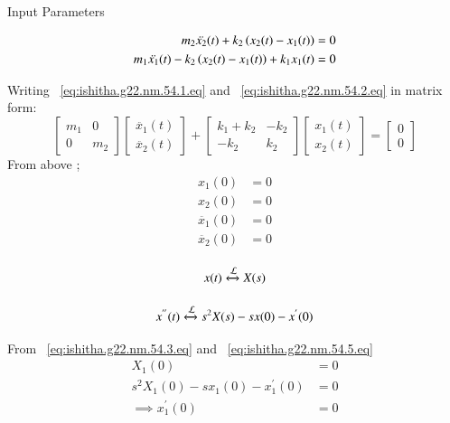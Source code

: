 \documentclass[journal,12pt,twocolumn]{IEEEtran}
\theoremstyle{remark}
\begin{document}
\begin{table}[!ht]    
    \centering
    \resizebox{9cm}{2cm}{
         
    }
    \caption{Input Parameters}
    \label{table:ishitha.g22.nm.54.t1}
\end{table}


\begin{align}
m_2\ddot{x_2}(t) + k_2\left(x_2(t)-x_1(t)\right)&=0
\label{eq:ishitha.g22.nm.54.1.eq} \\
m_1\ddot{x_1}(t) - k_2\left(x_2(t)-x_1(t)\right)+ k_1x_1(t)&=0
\label{eq:ishitha.g22.nm.54.2.eq}
\end{align}

Writing ~\eqref{eq:ishitha.g22.nm.54.1.eq} and ~\eqref{eq:ishitha.g22.nm.54.2.eq} in matrix form:
\[
\begin{bmatrix}
m_1 & 0  \\
0 & m_2
\end{bmatrix}
\begin{bmatrix}
\ddot{x_1}(t) \\
\ddot{x_2}(t)
\end{bmatrix}
+
\begin{bmatrix}
k_1+k_2 & -k_2  \\
-k_2 & k_2
\end{bmatrix}
\begin{bmatrix}
x_1(t) \\
x_2(t)
\end{bmatrix}
=
\begin{bmatrix}
0 \\
0
\end{bmatrix}
\]
From above ;
\begin{align}
x_1(0)&=0 
 \label{eq:ishitha.g22.nm.54.3.eq} \\
x_2(0)&=0 
\label{eq:ishitha.g22.nm.54.4.eq} \\
\ddot{x_1}(0)&=0 
\label{eq:ishitha.g22.nm.54.5.eq} \\
\ddot{x_2}(0)&=0
\label{eq:ishitha.g22.nm.54.6.eq} 
\end{align}

\begin{equation}
x(t)     \stackrel{}{\xleftrightarrow{\mathcal{L}}}   X(s)  
\end{equation}


\begin{equation}
x^{''}(t) \stackrel{}{\xleftrightarrow{\mathcal{L}}} s^{2}X(s)-sx(0)-x^{'}(0)
\end{equation}

From ~\eqref{eq:ishitha.g22.nm.54.3.eq} and ~\eqref{eq:ishitha.g22.nm.54.5.eq}
\begin{align}
X_1(0)&=0\\
s^{2}X_1(0)-sx_1(0)-x_1^{'}(0)&=0\\
\implies x_1^{'}(0)&=0
\end{align}
\end{document}
